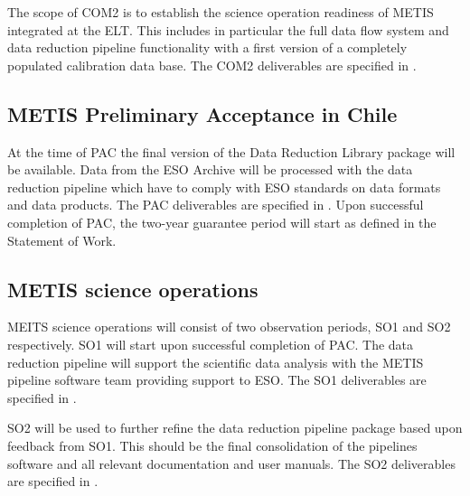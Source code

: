 The scope of COM2 is to establish the science operation readiness of METIS integrated at the ELT. This includes in particular the full data flow system and data reduction pipeline functionality with a first version of a completely populated calibration data base. The COM2 deliverables are specified in \cite{1618}.

\subsection{METIS Preliminary Acceptance in Chile}
\label{ssec:pae_chile}

At the time of PAC the final version of the Data Reduction Library package will be available. Data from the ESO Archive will be processed with the data reduction pipeline  which have to comply with ESO standards on data formats and data products. The PAC deliverables are specified in \cite{1618}. Upon successful completion of PAC, the two-year guarantee period will start as defined in the Statement of Work.

\subsection{METIS science operations}
\label{ssec:sciops}

MEITS science operations will consist of two observation periods, SO1 and SO2 respectively. SO1 will start upon successful completion of PAC. The data reduction pipeline will support the scientific data analysis with the METIS pipeline software team providing support to ESO. The SO1 deliverables are specified in \cite{1618}.

SO2 will be used to further refine the data reduction pipeline package based upon feedback from SO1. This should be the final consolidation of the pipelines software and all relevant documentation and user manuals. The SO2 deliverables are specified in \cite{1618}.
